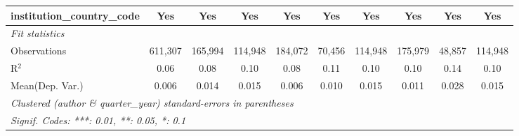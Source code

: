 \begin{tabular}{lccccccccc}
   institution\_country\_code             & Yes          & Yes           & Yes           & Yes          & Yes          & Yes           & Yes           & Yes           & Yes\\  
   \midrule
   \emph{Fit statistics}\\
   Observations                           & 611,307      & 165,994       & 114,948       & 184,072      & 70,456       & 114,948       & 175,979       & 48,857        & 114,948\\  
   R$^2$                                  & 0.06         & 0.08          & 0.10          & 0.08         & 0.11         & 0.10          & 0.10          & 0.14          & 0.10\\  
Mean(Dep. Var.) & 0.006 & 0.014 & 0.015 & 0.006 & 0.010 & 0.015 & 0.011 & 0.028 & 0.015 \\
   \midrule \midrule
   \multicolumn{10}{l}{\emph{Clustered (author \& quarter\_year) standard-errors in parentheses}}\\
   \multicolumn{10}{l}{\emph{Signif. Codes: ***: 0.01, **: 0.05, *: 0.1}}\\
\end{tabular}
\par\endgroup
